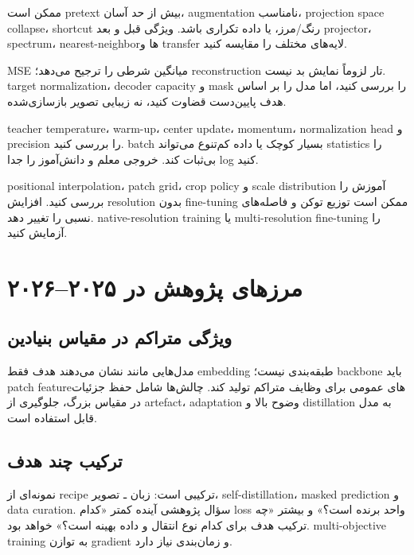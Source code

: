 \documentclass[12pt,openany,oneside]{book}
\begin{document}
\begin{diagnosticbox}
ممکن است pretext بیش از حد آسان، augmentation نامناسب، projection space collapse، shortcut رنگ/مرز، یا داده تکراری باشد. ویژگی قبل و بعد projector، spectrum، nearest-neighborها و transfer لایه‌های مختلف را مقایسه کنید.
\end{diagnosticbox}

\begin{diagnosticbox}
MSE میانگین شرطی را ترجیح می‌دهد؛ reconstruction تار لزوماً نمایش بد نیست. target normalization، decoder capacity و mask را بررسی کنید، اما مدل را بر اساس هدف پایین‌دست قضاوت کنید، نه زیبایی تصویر بازسازی‌شده.
\end{diagnosticbox}

\begin{diagnosticbox}
teacher temperature، warm-up، center update، momentum، normalization head و precision را بررسی کنید. batch بسیار کوچک یا داده کم‌تنوع می‌تواند statistics را بی‌ثبات کند. خروجی معلم و دانش‌آموز را جدا log کنید.
\end{diagnosticbox}

\begin{diagnosticbox}
positional interpolation، patch grid، crop policy و scale distribution آموزش را بررسی کنید. افزایش resolution بدون fine-tuning ممکن است توزیع توکن و فاصله‌های نسبی را تغییر دهد. native-resolution training یا multi-resolution fine-tuning را آزمایش کنید.
\end{diagnosticbox}

\section{مرزهای پژوهش در ۲۰۲۵--۲۰۲۶}
\subsection{ویژگی متراکم در مقیاس بنیادین}
مدل‌هایی مانند  نشان می‌دهند هدف فقط embedding طبقه‌بندی نیست؛ backbone باید patch featureهای عمومی برای وظایف متراکم تولید کند. چالش‌ها شامل حفظ جزئیات در مقیاس بزرگ، جلوگیری از artefact، adaptation وضوح بالا و distillation به مدل قابل استفاده است.

\subsection{ترکیب چند هدف}
 نمونه‌ای از recipe ترکیبی است: زبان ـ تصویر، self-distillation، masked prediction و data curation. سؤال پژوهشی آینده کمتر «کدام loss واحد برنده است؟» و بیشتر «چه ترکیب هدف برای کدام نوع انتقال و داده بهینه است؟» خواهد بود. multi-objective training به توازن gradient و زمان‌بندی نیاز دارد.
\end{document}
